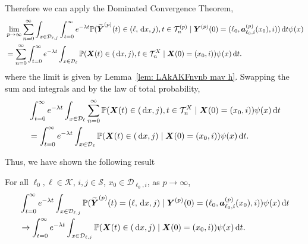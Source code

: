 Therefore we can apply the Dominated Convergence Theorem, 
\begin{align}
	&\lim_{p\to\infty} \sum_{n=0}^\infty\int_{x\in\mathcal D_{\ell,j}}\int_{t=0}^\infty e^{-\lambda t} \mathbb P(\widetilde{\boldsymbol Y}^{(p)}(t) \in (\ell, \, \mathrm{d} x, j), t\in\mathcal T_n^{(p)} \mid \nonumber 
	\boldsymbol Y^{(p)}(0)=(\ell_0, \boldsymbol  a_{\ell_0,i}^{(p)}(x_0),i))\, \mathrm{d} t \psi(x)  \nonumber
	\\&= \sum_{n=0}^\infty\int_{t=0}^\infty e^{-\lambda t}  \int_{x\in\mathcal{D}_\ell}\mathbb P(\boldsymbol X(t)\in(\, \mathrm{d} x, j), t\in\mathcal T_n^X 
	\mid \boldsymbol X(0)=(x_0,i)) \nonumber 
	\psi(x)\, \mathrm{d} t. \nonumber
\end{align}
where the limit is given by Lemma~\ref{lem: LAkAKFnvnb mav h}. Swapping the sum and integrals and by the law of total probability, 
\begin{align}
	& \int_{t=0}^\infty e^{-\lambda t}  \int_{x\in\mathcal{D}_\ell}\sum_{n=0}^\infty\mathbb P(\boldsymbol X(t)\in(\, \mathrm{d} x, j), t\in\mathcal T_n^X 
	\mid \boldsymbol X(0)=(x_0, i))\psi(x)\, \mathrm{d} t \nonumber
	\\&= \int_{t=0}^\infty e^{-\lambda t}  \int_{x\in\mathcal{D}_\ell} \mathbb P(\boldsymbol X(t)\in(\, \mathrm{d} x, j)  
	\mid \boldsymbol X(0)=(x_0, i))\psi(x)\, \mathrm{d} t. \nonumber
\end{align}

Thus, we have shown the following result
\begin{lem}\label{lem: KajPOw}
	For all \(\ell_0,\ell\in\mathcal K\), \(i,j\in\mathcal S\), \(x_0\in\mathcal D_{\ell_0,i}\), as \(p\to\infty\), 
	\begin{align}
		&\int_{t=0}^\infty e^{-\lambda t}\int_{x\in\mathcal D_{\ell,j}}\mathbb P(\widetilde{\boldsymbol Y}^{(p)}(t) = (\ell,\, \mathrm{d} x,j) \mid \boldsymbol Y^{(p)}(0)=(\ell_0, \boldsymbol a_{\ell_0,i}^{(p)}(x_0), i))  \psi(x)\, \mathrm{d} t \nonumber
		\\&\to \int_{t=0}^\infty e^{-\lambda t}  \int_{x\in\mathcal{D}_{\ell,j}} \mathbb P(\boldsymbol X(t)\in(\, \mathrm{d} x, j)  
		\mid \boldsymbol X(0)=(x_0, i))\psi(x)\, \mathrm{d} t. \nonumber
	\end{align}
\end{lem}
 
